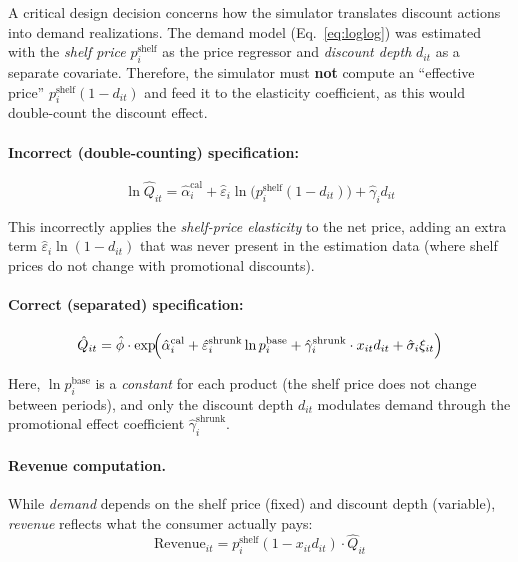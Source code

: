 \documentclass[12pt,a4paper]{article}
\begin{document}
A critical design decision concerns how the simulator translates
discount actions into demand realizations. The demand model
(Eq.~\ref{eq:loglog}) was estimated with the \emph{shelf price}
$p_i^{\text{shelf}}$ as the price regressor and \emph{discount depth}
$d_{it}$ as a separate covariate. Therefore, the simulator must
\textbf{not} compute an ``effective price''
$p_i^{\text{shelf}} (1 - d_{it})$ and feed it to the elasticity
coefficient, as this would double-count the discount effect.

\paragraph{Incorrect (double-counting) specification:}
\begin{equation}
\tag{wrong}
\ln \hat{Q}_{it} = \hat{\alpha}_i^{\text{cal}}
+ \hat{\varepsilon}_i \ln\bigl(p_i^{\text{shelf}} (1 - d_{it})\bigr)
+ \hat{\gamma}_i d_{it}
\end{equation}

This incorrectly applies the \emph{shelf-price elasticity} to the
net price, adding an extra term
$\hat{\varepsilon}_i \ln(1 - d_{it})$ that was never present in
the estimation data (where shelf prices do not change with
promotional discounts).

\paragraph{Correct (separated) specification:}
\begin{equation}
\label{eq:sim-demand}
\hat{Q}_{it} = \hat{\phi} \cdot \exp\!\Bigl(
\hat{\alpha}_i^{\text{cal}}
+ \hat{\varepsilon}_i^{\text{shrunk}} \ln p_i^{\text{base}}
+ \hat{\gamma}_i^{\text{shrunk}} \cdot x_{it} d_{it}
+ \hat{\sigma}_i \xi_{it}
\Bigr)
\end{equation}

Here, $\ln p_i^{\text{base}}$ is a \emph{constant} for each product
(the shelf price does not change between periods), and only the
discount depth $d_{it}$ modulates demand through the promotional
effect coefficient $\hat{\gamma}_i^{\text{shrunk}}$.

\paragraph{Revenue computation.}
While \emph{demand} depends on the shelf price (fixed) and discount
depth (variable), \emph{revenue} reflects what the consumer actually
pays:
\begin{equation}
\text{Revenue}_{it} = p_i^{\text{shelf}} (1 - x_{it} d_{it})
\cdot \hat{Q}_{it}
\end{equation}
\end{document}
